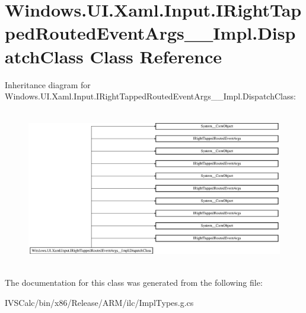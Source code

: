 \hypertarget{class_windows_1_1_u_i_1_1_xaml_1_1_input_1_1_i_right_tapped_routed_event_args_____impl_1_1_dispatch_class}{}\section{Windows.\+U\+I.\+Xaml.\+Input.\+I\+Right\+Tapped\+Routed\+Event\+Args\+\_\+\+\_\+\+Impl.\+Dispatch\+Class Class Reference}
\label{class_windows_1_1_u_i_1_1_xaml_1_1_input_1_1_i_right_tapped_routed_event_args_____impl_1_1_dispatch_class}
Inheritance diagram for Windows.\+U\+I.\+Xaml.\+Input.\+I\+Right\+Tapped\+Routed\+Event\+Args\+\_\+\+\_\+\+Impl.\+Dispatch\+Class\+:\begin{figure}[H]
\begin{center}
\leavevmode
\includegraphics[height=6.952596cm]{class_windows_1_1_u_i_1_1_xaml_1_1_input_1_1_i_right_tapped_routed_event_args_____impl_1_1_dispatch_class}
\end{center}
\end{figure}


The documentation for this class was generated from the following file\+:\begin{DoxyCompactItemize}
\item 
I\+V\+S\+Calc/bin/x86/\+Release/\+A\+R\+M/ilc/Impl\+Types.\+g.\+cs\end{DoxyCompactItemize}
